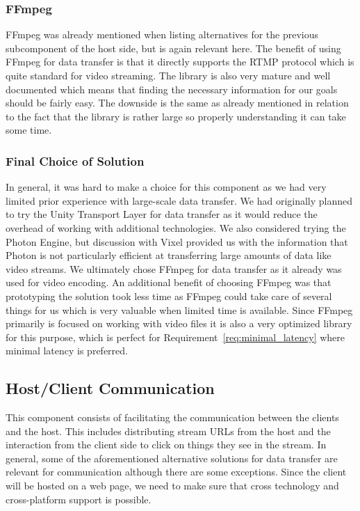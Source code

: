 \subsubsection{FFmpeg}
FFmpeg was already mentioned when listing alternatives for the previous subcomponent of the host side, but is again relevant here. The benefit of using FFmpeg for data transfer is that it directly supports the RTMP protocol which is quite standard for video streaming. The library is also very mature and well documented which means that finding the necessary information for our goals should be fairly easy. The downside is the same as already mentioned in relation to the fact that the library is rather large so properly understanding it can take some time. 

\subsubsection{Final Choice of Solution}
In general, it was hard to make a choice for this component as we had very limited prior experience with large-scale data transfer. We had originally planned to try the Unity Transport Layer for data transfer as it would reduce the overhead of working with additional technologies. We also considered trying the Photon Engine, but discussion with Vixel provided us with the information that Photon is not particularly efficient at transferring large amounts of data like video streams. We ultimately chose FFmpeg for data transfer as it already was used for video encoding. An additional benefit of choosing FFmpeg was that prototyping the solution took less time as FFmpeg could take care of several things for us which is very valuable when limited time is available. Since FFmpeg primarily is focused on working with video files it is also a very optimized library for this purpose, which is perfect for Requirement~\ref{req:minimal_latency} where minimal latency is preferred.

\subsection{Host/Client Communication} %
This component consists of facilitating the communication between the clients and the host. This includes distributing stream URLs from the host and the interaction from the client side to click on things they see in the stream. In general, some of the aforementioned alternative solutions for data transfer are relevant for communication although there are some exceptions. Since the client will be hosted on a web page, we need to make sure that cross technology and cross-platform support is possible. 
    
